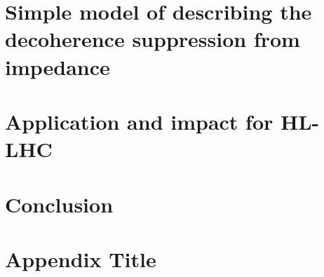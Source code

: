 \documentclass[12pt,twoside]{report} %
\begin{document}
\chapter{Simple model of describing the decoherence suppression from impedance}


\chapter{Application and impact for HL-LHC}


\chapter{Conclusion}


\appendix
\chapter{Appendix Title}


\backmatter
\printbibliography
{}
\end{document}
